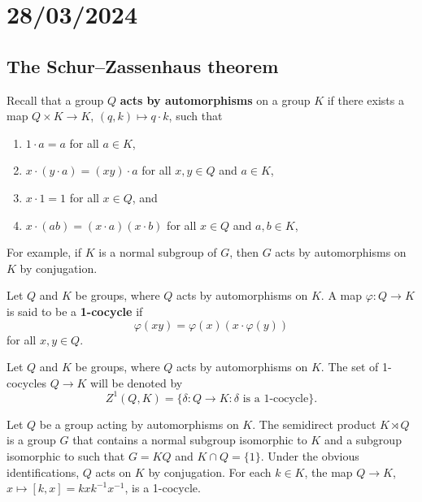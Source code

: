 \section{28/03/2024}

\subsection{The Schur--Zassenhaus theorem}


Recall that a group $Q$ \textbf{acts by automorphisms} on a group $K$ if 
there exists a map $Q\times K\to K$, $(q,k)\mapsto q\cdot k$, 
such that 
\begin{enumerate}
    \item $1\cdot a=a$ for all $a\in K$, 
    \item $x\cdot (y\cdot a)=(xy)\cdot a$ for all $x,y\in Q$ and $a\in K$, 
    \item $x\cdot 1=1$ for all $x\in Q$, and 
    \item $x\cdot (ab)=(x\cdot a)(x\cdot b)$ for all $x\in Q$ and $a,b\in K$, 
\end{enumerate}
For example, if $K$ is a normal subgroup of $G$, 
then $G$ acts by automorphisms on $K$ by conjugation. 

\begin{definition}
Let $Q$ and $K$ be groups, where $Q$ acts by automorphisms on $K$. 
A map 
$\varphi\colon Q\to K$ is said to be a \textbf{1-cocycle} if 
\[
	\varphi(xy)=\varphi(x)(x\cdot\varphi(y))
\]
for all $x,y\in Q$.  
\end{definition}

Let $Q$ and $K$ be groups, where $Q$ acts by automorphisms on $K$. 
The set of 1-cocycles $Q\to K$ will be denoted by 
\[
Z^1(Q,K)=\{\delta\colon Q\to K:\text{$\delta$ is a 1-cocycle}\}.
\]

\begin{example}
Let $Q$ be a group acting by automorphisms on $K$. 
The semidirect product $K\rtimes Q$ 
is a group $G$ that contains a normal subgroup isomorphic to $K$ 
and a subgroup isomorphic to such that 
$G=KQ$ and $K\cap Q=\{1\}$. Under the obvious identifications, 
$Q$ acts on $K$ by conjugation. For each $k\in K$, the map 
$Q\to K$, $x\mapsto [k,x]=kxk^{-1}x^{-1}$, is a 1-cocycle. 
\end{example}

